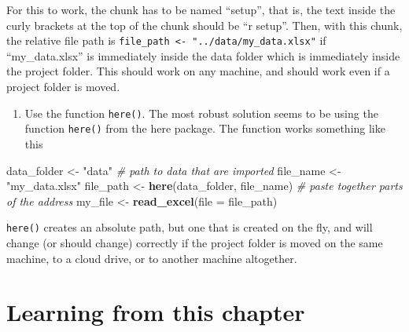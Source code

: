 \documentclass[]{book}
\newenvironment{Shaded}{\begin{snugshade}}{\end{snugshade}}
\newcommand{\CommentTok}[1]{\textcolor[rgb]{0.56,0.35,0.01}{\textit{#1}}}
\newcommand{\DataTypeTok}[1]{\textcolor[rgb]{0.13,0.29,0.53}{#1}}
\newcommand{\KeywordTok}[1]{\textcolor[rgb]{0.13,0.29,0.53}{\textbf{#1}}}
\newcommand{\NormalTok}[1]{#1}
\newcommand{\OperatorTok}[1]{\textcolor[rgb]{0.81,0.36,0.00}{\textbf{#1}}}
\newcommand{\StringTok}[1]{\textcolor[rgb]{0.31,0.60,0.02}{#1}}
\providecommand{\tightlist}{%
  \setlength{\itemsep}{0pt}\setlength{\parskip}{0pt}}
\begin{document}
\begin{Shaded}
\end{Shaded}

For this to work, the chunk has to be named ``setup'', that is, the text inside the curly brackets at the top of the chunk should be ``r setup''. Then, with this chunk, the relative file path is \texttt{file\_path\ \textless{}-\ "../data/my\_data.xlsx"} if ``my\_data.xlsx'' is immediately inside the data folder which is immediately inside the project folder. This should work on any machine, and should work even if a project folder is moved.

\begin{enumerate}
\def\labelenumi{\arabic{enumi}.}
\setcounter{enumi}{2}
\tightlist
\item
  Use the function \texttt{here()}. The most robust solution seems to be using the function \texttt{here()} from the here package. The function works something like this
\end{enumerate}

\begin{Shaded}
\begin{Highlighting}[]
\NormalTok{data_folder <-}\StringTok{ "data"} \CommentTok{# path to data that are imported}
\NormalTok{file_name <-}\StringTok{ "my_data.xlsx"}
\NormalTok{file_path <-}\StringTok{ }\KeywordTok{here}\NormalTok{(data_folder, file_name) }\CommentTok{# paste together parts of the address}
\NormalTok{my_file <-}\StringTok{ }\KeywordTok{read_excel}\NormalTok{(}\DataTypeTok{file =}\NormalTok{ file_path)}
\end{Highlighting}
\end{Shaded}

\texttt{here()} creates an absolute path, but one that is created on the fly, and will change (or should change) correctly if the project folder is moved on the same machine, to a cloud drive, or to another machine altogether.

\hypertarget{learning-from-this-chapter}{%
\section{Learning from this chapter}\label{learning-from-this-chapter}}
\end{document}
